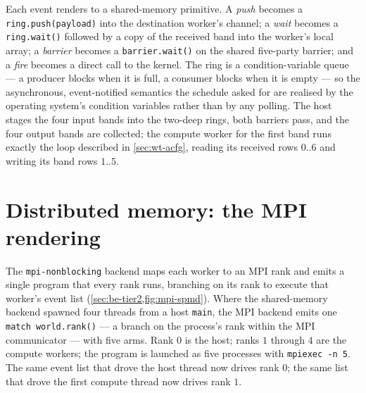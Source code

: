 Each event renders to a shared-memory primitive. A \emph{push} becomes a
\texttt{ring.push(payload)} into the destination worker's channel; a \emph{wait}
becomes a \texttt{ring.wait()} followed by a copy of the received band into the
worker's local array; a \emph{barrier} becomes a \texttt{barrier.wait()} on the
shared five-party barrier; and a \emph{fire} becomes a direct call to the kernel.
The ring is a condition-variable queue --- a producer blocks when it is full, a
consumer blocks when it is empty --- so the asynchronous, event-notified semantics
the schedule asked for are realised by the operating system's condition variables
rather than by any polling. The host stages the four input bands into the
two-deep rings, both barriers pass, and the four output bands are collected; the
compute worker for the first band runs exactly the loop described in
\cref{sec:wt-acfg}, reading its received rows $0..6$ and writing its band rows $1..5$.

\section{Distributed memory: the MPI rendering}\label{sec:wt-mpi}

The \texttt{mpi-nonblocking} backend maps each worker to an MPI rank and emits a
single program that every rank runs, branching on its rank to execute that worker's
event list (\cref{sec:be-tier2,fig:mpi-spmd}). Where the shared-memory backend
spawned four threads from a host \texttt{main}, the MPI backend emits one \texttt{match
world.rank()} --- a branch on the process's rank within the MPI communicator --- with
five arms. Rank $0$ is the host; ranks $1$ through $4$ are the compute workers; the
program is launched as five processes with \texttt{mpiexec~-n~5}. The same event
list that drove the host thread now drives rank $0$; the same list that drove the
first compute thread now drives rank $1$.

